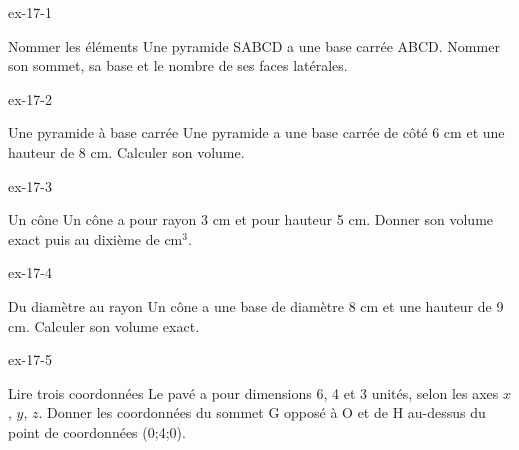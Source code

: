 \clearpage{}
\begin{blocLivre}{ex-17-1}\begin{exercice}[1]{Nommer les éléments}
Une pyramide SABCD a une base carrée ABCD. Nommer son sommet, sa base et le nombre de ses faces latérales.
\label{fig-ex-17-1}
\end{exercice}\end{blocLivre}
\begin{blocLivre}{ex-17-2}\begin{exercice}[1]{Une pyramide à base carrée}
Une pyramide a une base carrée de côté 6 cm et une hauteur de 8 cm. Calculer son volume.
\label{fig-ex-17-2}
\end{exercice}\end{blocLivre}
\begin{blocLivre}{ex-17-3}\begin{exercice}[1]{Un cône}
Un cône a pour rayon 3 cm et pour hauteur 5 cm. Donner son volume exact puis au dixième de cm$^3$.
\label{fig-ex-17-3}
\end{exercice}\end{blocLivre}
\begin{blocLivre}{ex-17-4}\begin{exercice}[1]{Du diamètre au rayon}
Un cône a une base de diamètre 8 cm et une hauteur de 9 cm. Calculer son volume exact.
\label{fig-ex-17-4}
\end{exercice}\end{blocLivre}
\begin{blocLivre}{ex-17-5}\begin{exercice}[1]{Lire trois coordonnées}
Le pavé a pour dimensions 6, 4 et 3 unités, selon les axes $x$, $y$, $z$. Donner les coordonnées du sommet G opposé à O et de H au-dessus du point de coordonnées (0;4;0).
\label{fig-ex-17-5}
\end{exercice}\end{blocLivre}


